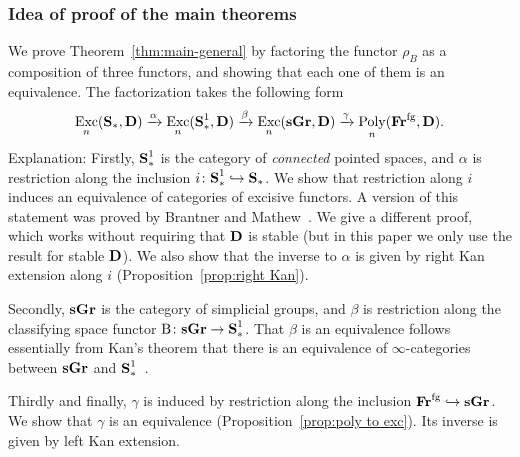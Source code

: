 \documentclass[psamsfonts]{amsart}
\theoremstyle{plain}
\theoremstyle{definition}
\theoremstyle{remark}
\newtheorem{rem}[thm]{Remark}
\newcommand{\catname}[1]{{\normalfont\textbf{#1}}}
\newcommand{\spaces}{\catname{S}_*}
\newcommand{\connected}{\spaces^{1}}
\newcommand{\fr}{\allfr^{\mathrm{fg}}}
\newcommand{\allfr}{\catname{Fr}}
\newcommand{\sgr}{\catname{sGr}}
\newcommand{\classifying}{\operatorname{B}}
\DeclareMathOperator{\poly}{Poly}
\DeclareMathOperator{\exc}{Exc}
\begin{document}
\subsubsection*{Idea of proof of the main theorems}
We prove Theorem~\ref{thm:main-general} by factoring the functor $\rho_B$ as a composition of three functors, and showing that each one of them is an equivalence. The factorization takes the following form
\begin{equation}\label{eq:factorization}
\exc_n(\spaces, \catname{D})\xrightarrow{\alpha} \exc_n(\connected, \catname{D}) \xrightarrow{\beta} \exc_n(\sgr, \catname{D})\xrightarrow{\gamma} \poly_n(\fr, \catname{D}).
\end{equation}
Explanation: Firstly, $\connected$ is the category of \emph{connected} pointed spaces, and $\alpha$ is restriction along the inclusion $i\colon\connected \hookrightarrow \spaces$. We show that restriction along $i$ induces an equivalence of categories of excisive functors. A version of this statement was proved by Brantner and Mathew~\cite[Theorem 3.36]{Brantner-Mathew}. We give a different proof, which works without requiring that $\catname{D}$ is stable (but in this paper we only use the result for stable $\catname{D}$). We also show that the inverse to $\alpha$ is given by right Kan extension along $i$ (Proposition~\ref{prop:right Kan}).

Secondly, $\sgr$ is the category of simplicial groups, and $\beta$ is restriction along the classifying space functor $\classifying\colon \sgr\to \connected$. That $\beta$ is an equivalence follows essentially from Kan's theorem that there is an equivalence of $\infty$-categories between $\sgr$ and $\connected$~\cite{KanLoop}.

Thirdly and finally, $\gamma$ is induced by restriction along the inclusion $\fr\hookrightarrow \sgr$. We show that $\gamma$ is an equivalence (Proposition~\ref{prop:poly to exc}). Its inverse is given by left Kan extension.
\end{document}

